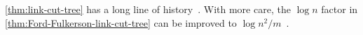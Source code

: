 \begin{note}
	\autoref{thm:link-cut-tree} has a long line of history~\cite{shiloach1978n,galil1980eviog2v,sleator1981nm,sleator1981data,dominic1983data}. With more care, the \(\log n\) factor in \autoref{thm:Ford-Fulkerson-link-cut-tree} can be improved to \(\log n^2 / m\)~\cite{goldberg1990finding}.
\end{note}